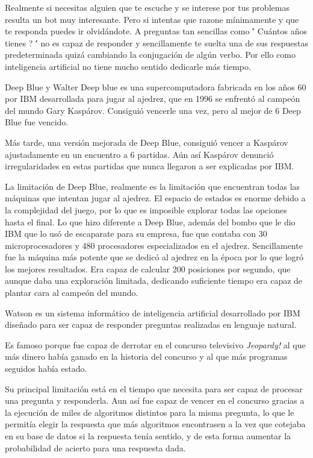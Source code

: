 \documentclass[spanish, a4paper, 12pt]{article} 	%
\begin{document}
\begin{section}
	Realmente si necesitas alguien que te escuche y se interese por tus problemas resulta un bot muy interesante. Pero si intentas que razone mínimamente y que te responda puedes ir olvidándote. A preguntas tan sencillas como \'' \¿Cuántos años tienes ? \'' no es capaz de responder y sencillamente te suelta una de sus respuestas predeterminada quizá cambiando la conjugación de algún verbo. Por ello como inteligencia artificial no tiene mucho sentido dedicarle más tiempo.
	
\end{section}
\begin{section}{Deep Blue y Walter}
	Deep blue es una supercomputadora fabricada en los años 60 por IBM desarrollada para jugar al ajedrez, que en 1996 se enfrentó al campeón del mundo Gary Kaspárov. Consiguió vencerle una vez, pero al mejor de 6 Deep Blue fue vencido.
	
	Más tarde, una versión mejorada de Deep Blue, consiguió vencer a Kaspárov ajustadamente en un encuentro a 6 partidas. Aún así Kaspárov denunció irregularidades en estas partidas que nunca llegaron a ser explicadas por IBM. 
	
	La limitación de Deep Blue, realmente es la limitación que encuentran todas las máquinas que intentan jugar al ajedrez. El espacio de estados es enorme debido a la complejidad del juego, por lo que es imposible explorar todas las opciones hasta el final. Lo que hizo diferente a Deep Blue, además del bombo que le dio IBM que lo usó de escaparate para su empresa, fue que contaba con 30  microprocesadores y 480 procesadores especializados en el ajedrez. Sencillamente fue la máquina más potente que se dedicó al ajedrez en la época por lo que logró los mejores resultados. Era capaz de calcular 200 posiciones por segundo, que aunque daba una exploración limitada, dedicando suficiente tiempo era capaz de plantar cara al campeón del mundo.
	
	
	
	Watson es un sistema informático de inteligencia artificial desarrollado por IBM diseñado para ser capaz de responder preguntas realizadas en lenguaje natural.
	
	Es famoso porque fue capaz de derrotar en el concurso televisivo \textit{Jeopardy!} al que más dinero había ganado en la historia del concurso y al que más programas seguidos había estado.
	
	Su principal limitación está en el tiempo que necesita para ser capaz de procesar una pregunta y responderla. Aun así fue capaz de vencer en el concurso gracias a la ejecución de miles de algoritmos distintos para la misma pregunta, lo que le permitía elegir la respuesta que más algoritmos encontrasen a la vez que cotejaba en su base de datos si la respuesta tenía sentido, y de esta forma aumentar la probabilidad de acierto para una respuesta dada. 
\end{section}
\end{document}
